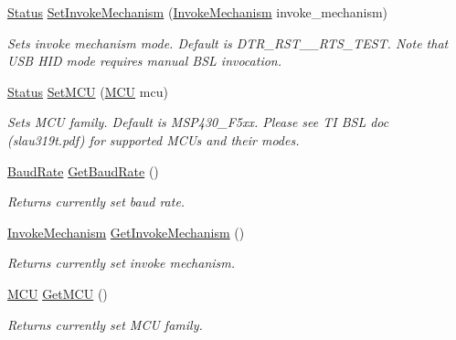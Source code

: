 \begin{DoxyCompactItemize}
\mbox{\hyperlink{class_b_s_l430___n_e_t_1_1_status}{Status}} \mbox{\hyperlink{class_b_s_l430___n_e_t_1_1_b_s_l430_n_e_t_ad8ec7dceb979a98e30bf59f7c5fde620}{Set\+Invoke\+Mechanism}} (\mbox{\hyperlink{namespace_b_s_l430___n_e_t_a6571fdf0fbbc8408b8428f4d642c1305}{Invoke\+Mechanism}} invoke\+\_\+mechanism)
\begin{DoxyCompactList}\small\item\em Sets invoke mechanism mode. Default is D\+T\+R\+\_\+\+R\+S\+T\+\_\+\+\_\+\+R\+T\+S\+\_\+\+T\+E\+ST. Note that U\+SB H\+ID mode requires manual B\+SL invocation. \end{DoxyCompactList}\item 
\mbox{\hyperlink{class_b_s_l430___n_e_t_1_1_status}{Status}} \mbox{\hyperlink{class_b_s_l430___n_e_t_1_1_b_s_l430_n_e_t_a22d6c0af4298026d7939bc993e9791ad}{Set\+M\+CU}} (\mbox{\hyperlink{namespace_b_s_l430___n_e_t_a2cdaa65be7e1679fc8ca77610b19a490}{M\+CU}} mcu)
\begin{DoxyCompactList}\small\item\em Sets M\+CU family. Default is M\+S\+P430\+\_\+\+F5xx. Please see TI B\+SL doc (slau319t.\+pdf) for supported M\+C\+Us and their modes. \end{DoxyCompactList}\item 
\mbox{\hyperlink{namespace_b_s_l430___n_e_t_a8d30c263598635a481840944d38aeb70}{Baud\+Rate}} \mbox{\hyperlink{class_b_s_l430___n_e_t_1_1_b_s_l430_n_e_t_aa2a47062b93eab1ff0ba09d7c0ff11c3}{Get\+Baud\+Rate}} ()
\begin{DoxyCompactList}\small\item\em Returns currently set baud rate. \end{DoxyCompactList}\item 
\mbox{\hyperlink{namespace_b_s_l430___n_e_t_a6571fdf0fbbc8408b8428f4d642c1305}{Invoke\+Mechanism}} \mbox{\hyperlink{class_b_s_l430___n_e_t_1_1_b_s_l430_n_e_t_aaf38a4fb21714699bbe2950108ae5c6d}{Get\+Invoke\+Mechanism}} ()
\begin{DoxyCompactList}\small\item\em Returns currently set invoke mechanism. \end{DoxyCompactList}\item 
\mbox{\hyperlink{namespace_b_s_l430___n_e_t_a2cdaa65be7e1679fc8ca77610b19a490}{M\+CU}} \mbox{\hyperlink{class_b_s_l430___n_e_t_1_1_b_s_l430_n_e_t_ac9bd1e8e4adc0355b5562a24717cfa35}{Get\+M\+CU}} ()
\begin{DoxyCompactList}\small\item\em Returns currently set M\+CU family. \end{DoxyCompactList}\item 

\end{DoxyCompactItemize}
